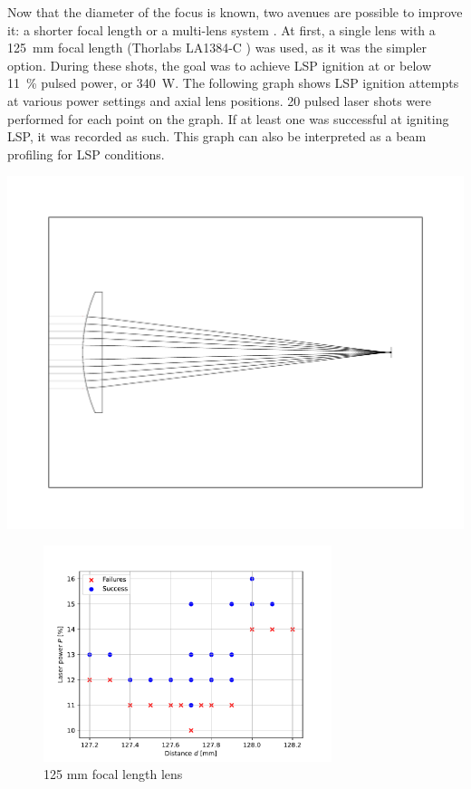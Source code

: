             Now that the diameter of the focus is known, two avenues are possible to improve it: a shorter focal length or a multi-lens system \cite{thorlabs}. At first, a single lens with a \qty{125}{mm} focal length (Thorlabs LA1384-C \cite{125mm lens}) was used, as it was the simpler option. During these shots, the goal was to achieve LSP ignition at or below \qty{11}{\%} pulsed power, or \qty{340}{W}. The following graph shows LSP ignition attempts at various power settings and axial lens positions. 20 pulsed laser shots were performed for each point on the graph. If at least one was successful at igniting LSP, it was recorded as such. This graph can also be interpreted as a beam profiling for LSP conditions.
            
            \includegraphics[width=\textwidth]{assets/5 results/125lens.pdf}

            \begin{figure}[h]
                \centering
                \includegraphics[width=0.75\textwidth]{assets/5 results/125mm_focus_threshold.pdf}
                \caption{125 mm focal length lens}
            \end{figure}
            
